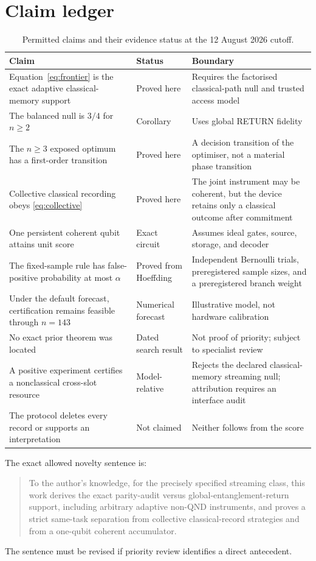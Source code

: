 \section{Claim ledger}
\label{app:claims}

\begin{table}[!t]
\centering
\caption{Permitted claims and their evidence status at the 12 August 2026 cutoff.}
\small
\begin{tabularx}{0.94\textwidth}{@{}p{}p{}Y@{}}
\toprule
Claim & Status & Boundary \\
\midrule
Equation~\eqref{eq:frontier} is the exact adaptive classical-memory support & Proved here & Requires the factorised classical-path null and trusted access model \\
The balanced null is $3/4$ for $n\geq2$ & Corollary & Uses global RETURN fidelity \\
The $n\geq3$ exposed optimum has a first-order transition & Proved here & A decision transition of the optimiser, not a material phase transition \\
Collective classical recording obeys \eqref{eq:collective} & Proved here & The joint instrument may be coherent, but the device retains only a classical outcome after commitment \\
One persistent coherent qubit attains unit score & Exact circuit & Assumes ideal gates, source, storage, and decoder \\
The fixed-sample rule has false-positive probability at most $\alpha$ & Proved from Hoeffding & Independent Bernoulli trials, preregistered sample sizes, and a preregistered branch weight \\
Under the default forecast, certification remains feasible through $n=143$ & Numerical forecast & Illustrative model, not hardware calibration \\
No exact prior theorem was located & Dated search result & Not proof of priority; subject to specialist review \\
A positive experiment certifies a nonclassical cross-slot resource & Model-relative & Rejects the declared classical-memory streaming null; attribution requires an interface audit \\
The protocol deletes every record or supports an interpretation & Not claimed & Neither follows from the score \\
\bottomrule
\end{tabularx}
\end{table}

The exact allowed novelty sentence is:
\begin{quote}
To the author's knowledge, for the precisely specified streaming class, this work derives the exact parity-audit versus global-entanglement-return support, including arbitrary adaptive non-QND instruments, and proves a strict same-task separation from collective classical-record strategies and from a one-qubit coherent accumulator.
\end{quote}
The sentence must be revised if priority review identifies a direct antecedent.
